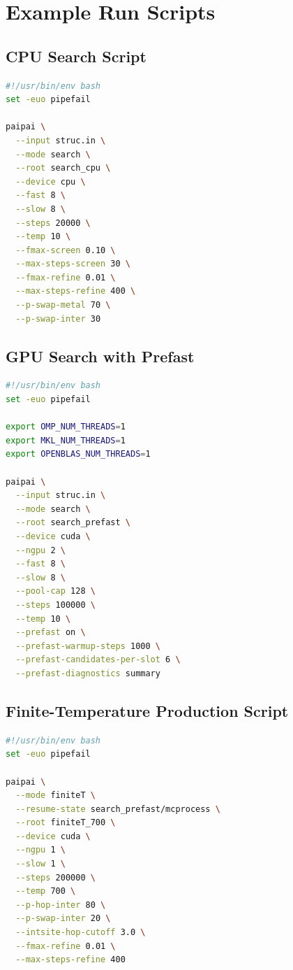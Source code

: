 \documentclass[11pt]{article}
\begin{document}
\section{Example Run Scripts}

\subsection{CPU Search Script}

\begin{lstlisting}[language=bash]
#!/usr/bin/env bash
set -euo pipefail

paipai \
  --input struc.in \
  --mode search \
  --root search_cpu \
  --device cpu \
  --fast 8 \
  --slow 8 \
  --steps 20000 \
  --temp 10 \
  --fmax-screen 0.10 \
  --max-steps-screen 30 \
  --fmax-refine 0.01 \
  --max-steps-refine 400 \
  --p-swap-metal 70 \
  --p-swap-inter 30
\end{lstlisting}

\subsection{GPU Search with Prefast}

\begin{lstlisting}[language=bash]
#!/usr/bin/env bash
set -euo pipefail

export OMP_NUM_THREADS=1
export MKL_NUM_THREADS=1
export OPENBLAS_NUM_THREADS=1

paipai \
  --input struc.in \
  --mode search \
  --root search_prefast \
  --device cuda \
  --ngpu 2 \
  --fast 8 \
  --slow 8 \
  --pool-cap 128 \
  --steps 100000 \
  --temp 10 \
  --prefast on \
  --prefast-warmup-steps 1000 \
  --prefast-candidates-per-slot 6 \
  --prefast-diagnostics summary
\end{lstlisting}

\subsection{Finite-Temperature Production Script}

\begin{lstlisting}[language=bash]
#!/usr/bin/env bash
set -euo pipefail

paipai \
  --mode finiteT \
  --resume-state search_prefast/mcprocess \
  --root finiteT_700 \
  --device cuda \
  --ngpu 1 \
  --slow 1 \
  --steps 200000 \
  --temp 700 \
  --p-hop-inter 80 \
  --p-swap-inter 20 \
  --intsite-hop-cutoff 3.0 \
  --fmax-refine 0.01 \
  --max-steps-refine 400
\end{lstlisting}
\end{document}

